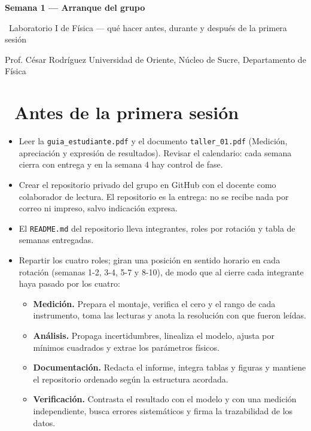 \documentclass[11pt,a4paper]{article}
\newcommand{\iconoBanda}{microchip}
\newcommand{\bandaTitulo}[3][fondoOscuro]{%
  \begin{tcolorbox}[
    enhanced,
    colback=#1, colframe=#1,
    boxrule=0pt, arc=8pt, outer arc=8pt,
    width=\linewidth,
    top=18pt, bottom=6pt, left=14pt, right=14pt,
    borderline south={3.5pt}{0pt}{cyanNeon},
  ]
    \begin{minipage}[c]{0.07\linewidth}
      \centering
      \textcolor{cyanNeon}{\fontsize{30}{30}\selectfont\faIcon{\iconoBanda}}
    \end{minipage}%
    \hspace{8pt}%
    \begin{minipage}[c]{0.88\linewidth}
      {\fontsize{20}{24}\selectfont\bfseries\color{white}#2}\par\vspace{5pt}%
      \textcolor{cyanNeon!80!white}{\small\faIcon{angle-right}~#3}%
    \end{minipage}
    \vspace{4pt}
  \end{tcolorbox}%
  \vspace{8pt}%
}
\newcommand{\iconotexto}[2]{\textcolor{cyanNeon}{\faIcon{#1}}~#2}
\begin{document}
\bandaTitulo[fondoOscuro]{Semana 1 --- Arranque del grupo}{Laboratorio I de Física --- qué hacer antes, durante y después de la primera sesión}

\begin{center}\small\color{grisTexto}Prof. César Rodríguez \textbar{} Universidad de Oriente, Núcleo de Sucre, Departamento de Física\end{center}

\section{\iconotexto{book}{Antes de la primera sesión}}

\begin{itemize}[leftmargin=1.4em,itemsep=2pt,topsep=3pt]
  \item Leer la \texttt{guia\_estudiante.pdf} y el documento \texttt{taller\_01.pdf} (Medición, apreciación y expresión de resultados). Revisar el calendario: cada semana cierra con entrega y en la semana 4 hay control de fase.
  \item Crear el repositorio privado del grupo en GitHub con el docente como colaborador de lectura. El repositorio es la entrega: no se recibe nada por correo ni impreso, salvo indicación expresa.
  \item El \texttt{README.md} del repositorio lleva integrantes, roles por rotación y tabla de semanas entregadas.
  \item Repartir los cuatro roles; giran una posición en sentido horario en cada rotación (semanas 1-2, 3-4, 5-7 y 8-10), de modo que al cierre cada integrante haya pasado por los cuatro:
  \begin{itemize}[leftmargin=1.2em,itemsep=1pt,topsep=2pt]
    \item \textbf{Medición.} Prepara el montaje, verifica el cero y el rango de cada instrumento, toma las lecturas y anota la resolución con que fueron leídas.
    \item \textbf{Análisis.} Propaga incertidumbres, linealiza el modelo, ajusta por mínimos cuadrados y extrae los parámetros físicos.
    \item \textbf{Documentación.} Redacta el informe, integra tablas y figuras y mantiene el repositorio ordenado según la estructura acordada.
    \item \textbf{Verificación.} Contrasta el resultado con el modelo y con una medición independiente, busca errores sistemáticos y firma la trazabilidad de los datos.
  \end{itemize}
\end{itemize}
\end{document}
